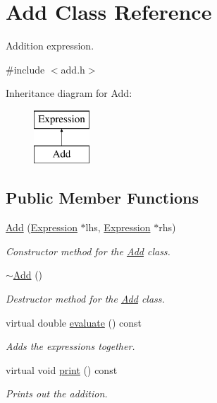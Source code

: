 \hypertarget{class_add}{}\section{Add Class Reference}
\label{class_add}


Addition expression.  




{\ttfamily \#include $<$add.\+h$>$}

Inheritance diagram for Add\+:\begin{figure}[H]
\begin{center}
\leavevmode
\includegraphics[height=2.000000cm]{class_add}
\end{center}
\end{figure}
\subsection*{Public Member Functions}
\begin{DoxyCompactItemize}
\item 
\hyperlink{class_add_aec3988b99721da89e8caa323f37c09f4}{Add} (\hyperlink{class_expression}{Expression} $\ast$lhs, \hyperlink{class_expression}{Expression} $\ast$rhs)
\begin{DoxyCompactList}\small\item\em Constructor method for the \hyperlink{class_add}{Add} class. \end{DoxyCompactList}\item 
\hyperlink{class_add_a960ca471ede083983766bce089f9af64}{$\sim$\+Add} ()
\begin{DoxyCompactList}\small\item\em Destructor method for the \hyperlink{class_add}{Add} class. \end{DoxyCompactList}\item 
virtual double \hyperlink{class_add_ac5b3425e7ac47b9f9a83e2f6da0d81ca}{evaluate} () const
\begin{DoxyCompactList}\small\item\em Adds the expressions together. \end{DoxyCompactList}\item 
virtual void \hyperlink{class_add_ad5af4ca57a44efab928c58ef39b00df1}{print} () const
\begin{DoxyCompactList}\small\item\em Prints out the addition. \end{DoxyCompactList}\end{DoxyCompactItemize}


